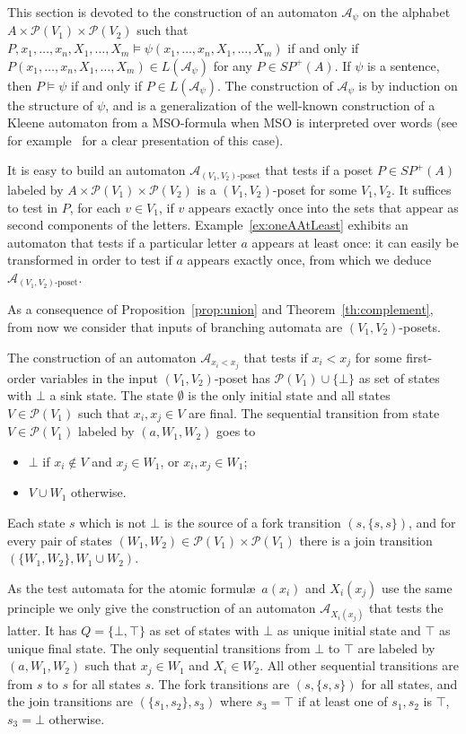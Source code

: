 \documentclass{CSML}
\begin{document}
This section is devoted to the construction of an automaton $\mathcal{A}_\psi$ on the alphabet $A\times {\mathcal P}(V_1)\times {\mathcal P}(V_2)$ such that $P,x_1,\dots,x_n,X_1,\dots,X_m\models\psi(x_1,\dots,x_n,X_1,\dots,X_m)$ if and only if $P(x_1,\dots,x_n,X_1,\dots,X_m)\in L(\mathcal{A}_\psi)$ for any $P\in SP^+(A)$. If $\psi$ is a sentence, then $P\models\psi$ if and only if $P\in L(\mathcal{A}_\psi)$. The construction of $\mathcal{A}_\psi$ is by induction on the structure of $\psi$, and is a generalization of the well-known construction of a Kleene automaton from a MSO-formula when MSO is interpreted over words (see for example~\cite{Str94} for a clear presentation of this case).

It is easy to build an automaton $\mathcal{A}_{\text{$(V_1,V_2)$-poset}}$ that tests if a poset $P\in SP^+(A)$ labeled by  $A\times {\mathcal P}(V_1)\times {\mathcal P}(V_2)$ is a $(V_1,V_2)$-poset for some $V_1,V_2$. It suffices to test in $P$, for each $v\in V_1$, if $v$ appears exactly once into the sets that appear as second components of the letters. Example~\ref{ex:oneAAtLeast} exhibits an automaton that tests if a particular letter $a$ appears at least once: it can easily be transformed in order to test if $a$ appears exactly once, from which we deduce $\mathcal{A}_{\text{$(V_1,V_2)$-poset}}$.

As a consequence of Proposition~\ref{prop:union} and Theorem~\ref{th:complement}, from now we consider that inputs of branching automata are $(V_1,V_2)$-posets.

The construction of an automaton $\mathcal{A}_{x_i<x_j}$ that tests if $x_i<x_j$ for some first-order variables in the input $(V_1,V_2)$-poset has  ${\mathcal P}(V_1)\cup\{\bot\}$ as set of states with $\bot$ a sink state. The state $\emptyset$ is the only initial state and all states $V\in {\mathcal P}(V_1)$ such that $x_i,x_j\in V$ are final. 
The sequential transition from state $V\in {\mathcal P}(V_1)$ labeled by $(a,W_1,W_2)$ goes to
\begin{itemize}
\item $\bot$ if  $x_i\not\in V$ and $x_j\in W_1$, or $x_i,x_j\in W_1$;
\item $V\cup W_1$ otherwise.
\end{itemize}
Each state $s$ which is not $\bot$ is the source of a fork transition $(s,\{s,s\})$, and for every pair of states $(W_1,W_2)\in {\mathcal P}(V_1)\times {\mathcal P}(V_1)$ there is a join transition $(\{W_1,W_2\},W_1\cup W_2)$.

As the test automata for the atomic formul\ae\ $a(x_i)$ and $X_i(x_j)$ use the same principle we only give the construction of an automaton $\mathcal{A}_{X_i(x_j)}$ that tests the latter. It has $Q=\{\bot,\top\}$ as set of states with $\bot$ as unique initial state and $\top$ as unique final state.
The only sequential transitions from $\bot$ to $\top$ are labeled by $(a,W_1,W_2)$ such that $x_j\in W_1$ and $X_i\in W_2$. All other sequential transitions are from $s$ to $s$ for all states $s$. The fork transitions are $(s,\{s,s\})$ for all states, and the join transitions are $(\{s_1,s_2\},s_3)$ where $s_3=\top$ if at least one of $s_1,s_2$ is $\top$, $s_3=\bot$ otherwise.
\end{document}
